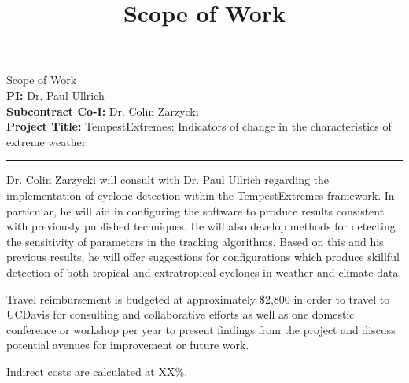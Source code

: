 \documentclass[11pt]{article}
\begin{document}
\title{Scope of Work}
\date{}


\begin{center}
\Large Scope of Work \\ [0.5cm]

\large \textbf{PI:} Dr. Paul Ullrich \\
\large \textbf{Subcontract Co-I:} Dr. Colin Zarzycki \\[0.25cm]

\large \textbf{Project Title:} TempestExtremes: Indicators of change in the characteristics of extreme weather \\ [0.5cm]
\hrule

\end{center}

Dr. Colin Zarzycki will consult with Dr. Paul Ullrich regarding the implementation of cyclone detection within the TempestExtremes framework. In particular, he will aid in configuring the software to produce results consistent with previously published techniques. He will also develop methods for detecting the sensitivity of parameters in the tracking algorithms. Based on this and his previous results, he will offer suggestions for configurations which produce skillful detection of both tropical and extratropical cyclones in weather and climate data.

Travel reimbursement is budgeted at approximately \$2,800 in order to travel to UCDavis for consulting and collaborative efforts as well as one domestic conference or workshop per year to present findings from the project and discuss potential avenues for improvement or future work.

Indirect costs are calculated at XX\%.
\end{document}
